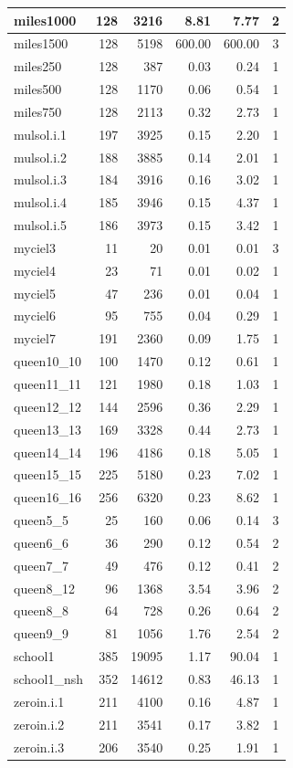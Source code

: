 \begin{table}[H]
\begin{tabular}{|l|r|r|r|r|c|}
miles1000 & 128 & 3216 & 8.81 & 7.77 & 2 \\ \hline
miles1500 & 128 & 5198 & 600.00 & 600.00 & 3 \\ \hline
miles250 & 128 & 387 & 0.03 & 0.24 & 1 \\ \hline
miles500 & 128 & 1170 & 0.06 & 0.54 & 1 \\ \hline
miles750 & 128 & 2113 & 0.32 & 2.73 & 1 \\ \hline
mulsol.i.1 & 197 & 3925 & 0.15 & 2.20 & 1 \\ \hline
mulsol.i.2 & 188 & 3885 & 0.14 & 2.01 & 1 \\ \hline
mulsol.i.3 & 184 & 3916 & 0.16 & 3.02 & 1 \\ \hline
mulsol.i.4 & 185 & 3946 & 0.15 & 4.37 & 1 \\ \hline
mulsol.i.5 & 186 & 3973 & 0.15 & 3.42 & 1 \\ \hline
myciel3 & 11 & 20 & 0.01 & 0.01 & 3 \\ \hline
myciel4 & 23 & 71 & 0.01 & 0.02 & 1 \\ \hline
myciel5 & 47 & 236 & 0.01 & 0.04 & 1 \\ \hline
myciel6 & 95 & 755 & 0.04 & 0.29 & 1 \\ \hline
myciel7 & 191 & 2360 & 0.09 & 1.75 & 1 \\ \hline
queen10\_10 & 100 & 1470 & 0.12 & 0.61 & 1 \\ \hline
queen11\_11 & 121 & 1980 & 0.18 & 1.03 & 1 \\ \hline
queen12\_12 & 144 & 2596 & 0.36 & 2.29 & 1 \\ \hline
queen13\_13 & 169 & 3328 & 0.44 & 2.73 & 1 \\ \hline
queen14\_14 & 196 & 4186 & 0.18 & 5.05 & 1 \\ \hline
queen15\_15 & 225 & 5180 & 0.23 & 7.02 & 1 \\ \hline
queen16\_16 & 256 & 6320 & 0.23 & 8.62 & 1 \\ \hline
queen5\_5 & 25 & 160 & 0.06 & 0.14 & 3 \\ \hline
queen6\_6 & 36 & 290 & 0.12 & 0.54 & 2 \\ \hline
queen7\_7 & 49 & 476 & 0.12 & 0.41 & 2 \\ \hline
queen8\_12 & 96 & 1368 & 3.54 & 3.96 & 2 \\ \hline
queen8\_8 & 64 & 728 & 0.26 & 0.64 & 2 \\ \hline
queen9\_9 & 81 & 1056 & 1.76 & 2.54 & 2 \\ \hline
school1 & 385 & 19095 & 1.17 & 90.04 & 1 \\ \hline
school1\_nsh & 352 & 14612 & 0.83 & 46.13 & 1 \\ \hline
zeroin.i.1 & 211 & 4100 & 0.16 & 4.87 & 1 \\ \hline
zeroin.i.2 & 211 & 3541 & 0.17 & 3.82 & 1 \\ \hline
zeroin.i.3 & 206 & 3540 & 0.25 & 1.91 & 1 \\ \hline
\end{tabular}
\end{table}


